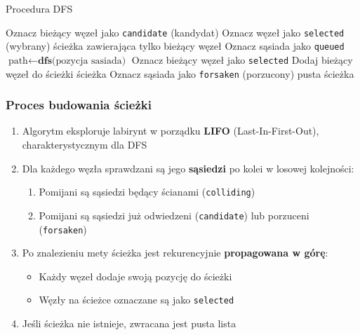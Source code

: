 \documentclass[../../../../doc.tex]{subfiles}
\begin{document}
\begin{algorithm}
  \caption{Procedura DFS}
  \begin{algorithmic}
    \STATE Oznacz bieżący węzeł jako \texttt{candidate} (kandydat)
    \STATE Oznacz węzeł jako \texttt{selected} (wybrany)
    \RETURN ścieżka zawierająca tylko bieżący węzeł
    \ENDIF
    \STATE Oznacz sąsiada jako \texttt{queued}
    \STATE $\text{path} \leftarrow \textbf{dfs}\text{(pozycja sasiada)}$
    \STATE Oznacz bieżący węzeł jako \texttt{selected}
    \STATE Dodaj bieżący węzeł do ścieżki
    \RETURN ścieżka
    \ELSE
    \STATE Oznacz sąsiada jako \texttt{forsaken} (porzucony)
    \ENDIF
    \ENDIF
    \ENDFOR
    \RETURN pusta ścieżka
  \end{algorithmic}
\end{algorithm}

\subsubsection{Proces budowania ścieżki}
\begin{enumerate}
  \item Algorytm eksploruje labirynt w porządku \textbf{LIFO} (Last-In-First-Out), charakterystycznym dla DFS
  \item Dla każdego węzła sprawdzani są jego \textbf{sąsiedzi} po kolei w losowej kolejności:
        \begin{enumerate}
          \item Pomijani są sąsiedzi będący ścianami (\texttt{colliding})
          \item Pomijani są sąsiedzi już odwiedzeni (\texttt{candidate}) lub porzuceni (\texttt{forsaken})
        \end{enumerate}
  \item Po znalezieniu mety ścieżka jest rekurencyjnie \textbf{propagowana w górę}:
        \begin{itemize}
          \item Każdy węzeł dodaje swoją pozycję do ścieżki
          \item Węzły na ścieżce oznaczane są jako \texttt{selected}
        \end{itemize}
  \item Jeśli ścieżka nie istnieje, zwracana jest pusta lista
\end{enumerate}
\end{document}
